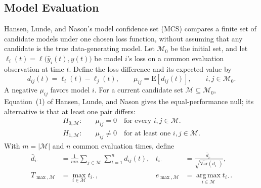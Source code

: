\documentclass[12pt,a4paper]{article}
\numberwithin{equation}{section}
\numberwithin{table}{section}
\numberwithin{figure}{section}
\begin{document}
\subsection{Model Evaluation}
Hansen, Lunde, and Nason's \cite{hansen2011mcs} model confidence set (MCS) compares a finite set of candidate models under one chosen loss function, without assuming that any candidate is the true data-generating model. Let $\mathcal M_0$ be the initial set, and let $\ell_i(t)=\ell\bigl(\widehat y_i(t),y(t)\bigr)$ be model $i$'s loss on a common evaluation observation at time $t$. Define the loss difference and its expected value by
\begin{equation}\label{eq:mcs-loss-difference}
d_{ij}(t)=\ell_i(t)-\ell_j(t),\qquad
\mu_{ij}=\mathrm E[d_{ij}(t)],\qquad i,j\in\mathcal M_0.
\end{equation}
A negative $\mu_{ij}$ favors model $i$. For a current candidate set $\mathcal M\subseteq\mathcal M_0$, Equation~(1) of Hansen, Lunde, and Nason gives the equal-performance null; its alternative is that at least one pair differs:
\begin{equation}\label{eq:mcs-null}
\begin{aligned}
H_{0,\mathcal M}:&\quad \mu_{ij}=0\quad\text{for every }i,j\in\mathcal M.\\
H_{1,\mathcal M}:&\quad \mu_{ij}\ne0\quad\text{for at least one }i,j\in\mathcal M.
\end{aligned}
\end{equation}
\medskip
\noindent
With $m=|\mathcal M|$ and $n$ common evaluation times, define
\begin{equation}\label{eq:mcs-standardized-loss}
\begin{aligned}
\bar d_{i\cdot}&=\frac{1}{mn}\sum_{j\in\mathcal M}\sum_{t=1}^{n}d_{ij}(t),
&t_{i\cdot}&=\frac{\bar d_{i\cdot}}{\sqrt{\widehat{\mathrm{Var}}(\bar d_{i\cdot})}},\\
T_{\max,\mathcal M}&=\max_{i\in\mathcal M}t_{i\cdot},
&e_{\max,\mathcal M}&=\operatorname*{arg\,max}_{i\in\mathcal M}t_{i\cdot}.
\end{aligned}
\end{equation}
\end{document}
